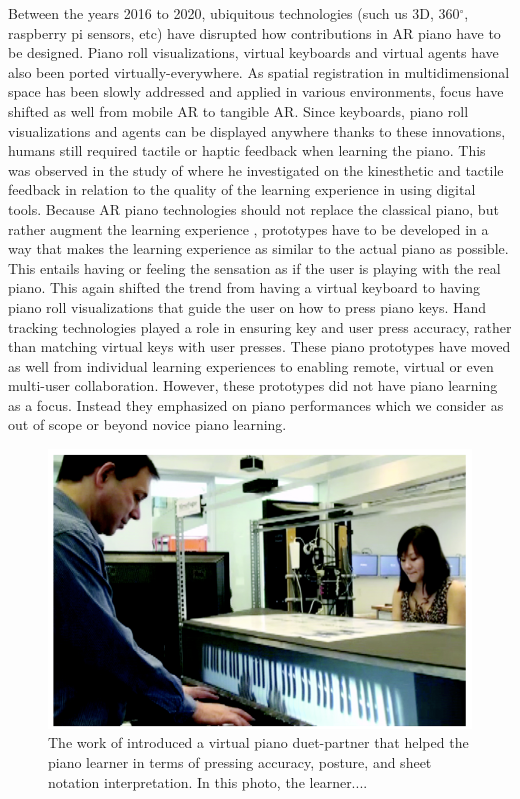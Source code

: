 \documentclass[manuscript,screen]{acmart}
\begin{document}
Between the years 2016 to 2020, ubiquitous technologies (such us 3D, 360$^{\circ}$, raspberry pi sensors, etc) have disrupted how contributions in AR piano have to be designed. Piano roll visualizations, virtual keyboards and virtual agents have also been ported virtually-everywhere. As spatial registration in multidimensional space has been slowly addressed \cite{roberts2011spatial,novotny2013applications, billinghurst2008tangible} and applied in various environments, focus have shifted as well from mobile AR to tangible AR. Since keyboards, piano roll visualizations and agents can be displayed anywhere thanks to these innovations, humans still required tactile or haptic feedback when learning the piano. This was observed in the study of \citet{hamam2013effect} where he investigated on the kinesthetic and tactile feedback in relation to the quality of the learning experience in using digital tools. Because AR piano technologies should not replace the classical piano, but rather augment the learning experience \cite{yang2020modern}, prototypes have to be developed in a way that makes the learning experience as similar to the actual piano as possible. This entails having or feeling the sensation as if the user is playing with the real piano. This again shifted the trend from having a virtual keyboard to having piano roll visualizations that guide the user on how to press piano keys. Hand tracking technologies played a role in ensuring key and user press accuracy, rather than matching virtual keys with user presses. These piano prototypes have moved as well from individual learning experiences to enabling remote, virtual or even multi-user collaboration. However, these prototypes did not have piano learning as a focus. Instead they emphasized on piano performances which we consider as out of scope or beyond novice piano learning. 

\begin{figure}
    \centering
    \includegraphics[width=15cm]{figures/xiaomrror2011.png}
    \caption{The work of \citet{xiao2011duet} introduced a virtual piano duet-partner that helped the piano learner in terms of pressing accuracy, posture, and sheet notation interpretation. In this photo, the learner....  }
    \label{fig:xiaomirror2011}
\end{figure}
\end{document}
